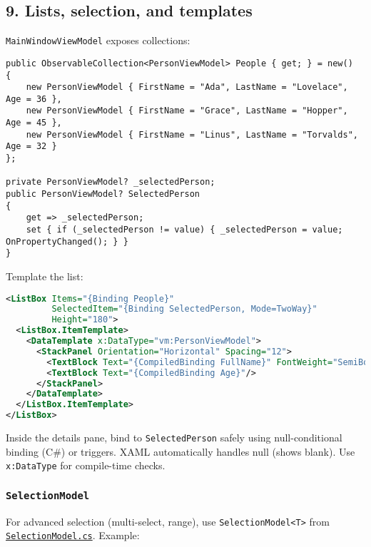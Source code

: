 \subsection{9. Lists, selection, and
templates}\label{lists-selection-and-templates}

\passthrough{\lstinline!MainWindowViewModel!} exposes collections:

\begin{lstlisting}
public ObservableCollection<PersonViewModel> People { get; } = new()
{
    new PersonViewModel { FirstName = "Ada", LastName = "Lovelace", Age = 36 },
    new PersonViewModel { FirstName = "Grace", LastName = "Hopper", Age = 45 },
    new PersonViewModel { FirstName = "Linus", LastName = "Torvalds", Age = 32 }
};

private PersonViewModel? _selectedPerson;
public PersonViewModel? SelectedPerson
{
    get => _selectedPerson;
    set { if (_selectedPerson != value) { _selectedPerson = value; OnPropertyChanged(); } }
}
\end{lstlisting}

Template the list:

\begin{lstlisting}[language=XML]
<ListBox Items="{Binding People}"
         SelectedItem="{Binding SelectedPerson, Mode=TwoWay}"
         Height="180">
  <ListBox.ItemTemplate>
    <DataTemplate x:DataType="vm:PersonViewModel">
      <StackPanel Orientation="Horizontal" Spacing="12">
        <TextBlock Text="{CompiledBinding FullName}" FontWeight="SemiBold"/>
        <TextBlock Text="{CompiledBinding Age}"/>
      </StackPanel>
    </DataTemplate>
  </ListBox.ItemTemplate>
</ListBox>
\end{lstlisting}

Inside the details pane, bind to
\passthrough{\lstinline!SelectedPerson!} safely using null-conditional
binding (C\#) or triggers. XAML automatically handles null (shows
blank). Use \passthrough{\lstinline!x:DataType!} for compile-time
checks.

\subsubsection{\texorpdfstring{\texttt{SelectionModel}}{SelectionModel}}\label{selectionmodel}

For advanced selection (multi-select, range), use
\passthrough{\lstinline!SelectionModel<T>!} from
\href{https://github.com/AvaloniaUI/Avalonia/blob/master/src/Avalonia.Controls/Selection/SelectionModel.cs}{\passthrough{\lstinline!SelectionModel.cs!}}.
Example:

